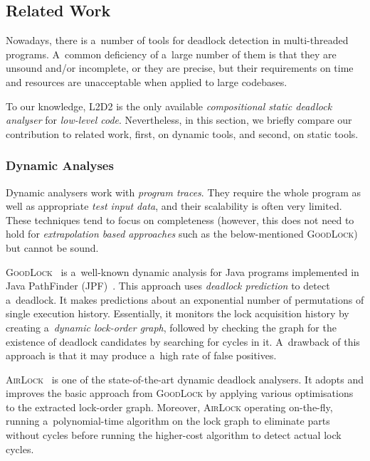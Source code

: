 \documentclass[runningheads]{llncs}
\begin{document}
\subsection{Related Work}
\label{sec:relwork}

Nowadays, there is a~number of tools for deadlock detection in
multi-threaded programs. A~common deficiency of a~large number of them
is that they are unsound and/or incomplete, or they are precise, but
their requirements on time and resources are unacceptable when applied to
large codebases.

To our knowledge, \textsc{L2D2} is the only available \emph{compositional
static deadlock analyser} for \emph{low-level code}. Nevertheless, in this
section, we briefly compare our contribution to related work, first, on
dynamic tools, and second, on static tools.

\subsubsection{Dynamic Analyses}

Dynamic analysers work with \emph{program traces}. They require the whole
program as well as appropriate \emph{test input data}, and their scalability
is often very limited. These techniques tend to focus on completeness
(however, this does not need to hold for \emph{extrapolation based approaches}
such as the below-mentioned \textsc{GoodLock}) but cannot be sound.

\textsc{GoodLock}~\cite{goodlock00} is a~well-known dynamic analysis for
Java programs implemented in Java PathFinder (JPF)~\cite{jpf00}. This
approach uses \emph{deadlock prediction} to detect a~deadlock. It makes
predictions about an exponential number of permutations of single
execution history. Essentially, it monitors the lock acquisition history
by creating a~\emph{dynamic lock-order graph}, followed by checking the
graph for the existence of deadlock candidates by searching for cycles
in it. A~drawback of this approach is that it may produce a~high rate
of false positives.

\textsc{AirLock}~\cite{airlock20} is one of the state-of-the-art dynamic
deadlock analysers. It adopts and improves the basic approach from
\textsc{GoodLock} by applying various optimisations to the extracted
lock-order graph. Moreover, \textsc{AirLock} operating on-the-fly,
running a~polynomial-time algorithm on the lock graph to eliminate parts
without cycles before running the higher-cost algorithm to detect
actual lock cycles.
\end{document}
